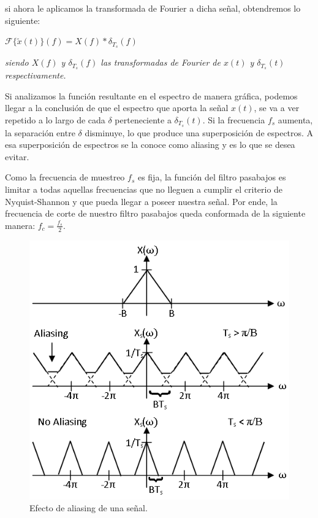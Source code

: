 \documentclass[../../ASSD_TP1_G7.tex]{subfiles}
\begin{document}
si ahora le aplicamos la transformada de Fourier a dicha señal, obtendremos
lo siguiente:
\begin{center}
{\Large{}$\mathcal{F}\{\tilde{x}(t)\}(f)=X(f)*\delta_{T_{s}}(f)$}{\Large\par}
\par\end{center}

\begin{center}
\textit{\footnotesize{}siendo $X(f)$ y $\delta_{T_{s}}(f)$ las transformadas
de Fourier de $x(t)$ y $\delta_{T_{s}}(t)$ respectivamente. }{\footnotesize\par}
\par\end{center}

Si analizamos la función resultante en el espectro de manera gráfica,
podemos llegar a la conclusión de que el espectro que aporta la señal
$x(t)$, se va a ver repetido a lo largo de cada $\delta$ perteneciente
a $\delta_{T_{s}}(t)$. Si la frecuencia $f_{s}$ aumenta, la separación
entre $\delta$ disminuye, lo que produce una superposición de espectros.
A esa superposición de espectros se la conoce como aliasing y es lo
que se desea evitar.

Como la frecuencia de muestreo $f_{s}$ es fija, la función del filtro
pasabajos es limitar a todas aquellas frecuencias que no lleguen a
cumplir el criterio de Nyquist-Shannon y que pueda llegar a poseer
nuestra señal. Por ende, la frecuencia de corte de nuestro filtro
pasabajos queda conformada de la siguiente manera: $f_{c}=\frac{f_{s}}{2}$.


\begin{figure}%
\begin{centering}
\includegraphics[scale=0.6]{Imagenes/aliasing}\caption{Efecto de aliasing de una señal.}
\par\end{centering}
\end{figure}%
\end{document}
